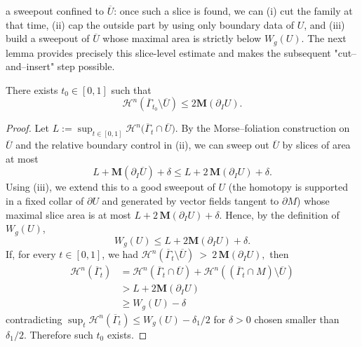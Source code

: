 a sweepout confined to $\overline U$: once such a slice is found, we can (i) cut the family at that
time, (ii) cap the outside part by using only boundary data of $U$, and (iii) build a sweepout of
$\overline U$ whose maximal area is strictly below $W_g(U)$. The next lemma provides precisely this
slice-level estimate and makes the subsequent "cut–and–insert" step possible.
\begin{lemma}\label{lem:barU-slice-outside}
There exists $t_0\in[0,1]$ such that
\begin{equation*}
  \mathcal{H}^n(\overline{\Gamma}_{t_0}\setminus \overline U)\leq2\mathbf{M}(\partial_I U).
\end{equation*}
\end{lemma}
\begin{proof}
    Let $L:=\sup_{t\in[0,1]}\mathcal{H}^n\bigl(\overline{\Gamma}_t\cap \overline U)$. By the Morse–foliation construction on $\overline U$ and the relative boundary control in (ii), we can sweep out $\overline U$
    by slices of area at most
\begin{equation*}
  L+\mathbf{M}(\partial_I\overline U)+\delta \le L+2\,\mathbf{M}(\partial_IU)+\delta.
\end{equation*}
Using (iii), we extend this to a good sweepout of $U$ (the homotopy is supported in a fixed collar of $\partial U$ and generated by vector fields tangent to $\partial M$) whose maximal slice area is at most $L+2\,\mathbf{M}(\partial_IU)+\delta$. Hence, by the definition of $W_g(U)$,
\begin{equation*}
  W_g(U)\le L+2\mathbf{M}(\partial_IU)+\delta.
\end{equation*}
If, for every $t\in[0,1]$, we had $\mathcal{H}^n(\overline{\Gamma}_t\setminus \overline U)\ >\ 2\,\mathbf{M}(\partial_IU),$
then
\begin{equation*}
    \begin{split}
        \mathcal{H}^n(\overline{\Gamma}_t) &= \mathcal{H}^n(\overline{\Gamma}_t\cap \overline U) + \mathcal{H}^n( (\overline{\Gamma}_t\cap M)\setminus \overline U)\\
        &> L + 2\mathbf{M}(\partial_IU)\\
        &\geq W_g(U)-\delta
    \end{split}
\end{equation*}
contradicting $\sup_t\mathcal{H}^n(\overline{\Gamma}_t)\le W_g(U)-\delta_1/2$ for $\delta>0$ chosen smaller than $\delta_1/2$.
Therefore such $t_0$ exists.
\end{proof}

